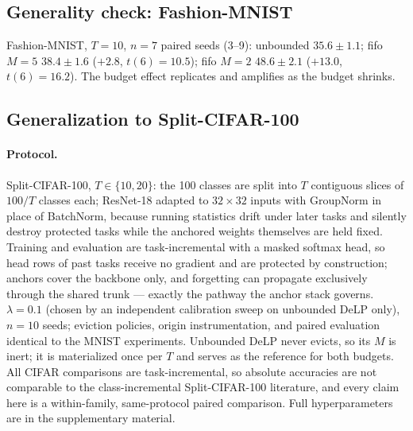 \documentclass[review,11pt,number]{elsarticle}
\newcommand{\delp}{DeLP}
\begin{document}
\subsection{Generality check: Fashion-MNIST}
\label{sec:exp-fashion}

Fashion-MNIST, $T{=}10$, $n{=}7$ paired seeds (3--9): unbounded
$35.6\pm1.1$; fifo $M{=}5$ $38.4\pm1.6$ ($+2.8$, $t(6){=}10.5$); fifo
$M{=}2$ $48.6\pm2.1$ ($+13.0$, $t(6){=}16.2$). The budget
effect replicates and amplifies as the budget shrinks.

\subsection{Generalization to Split-CIFAR-100}
\label{sec:exp-cifar}

\paragraph{Protocol.}
Split-CIFAR-100, $T \in \{10, 20\}$: the 100 classes are split into
$T$ contiguous slices of $100/T$ classes each; ResNet-18 adapted to
$32{\times}32$ inputs with GroupNorm in place of BatchNorm, because
running statistics drift under later tasks and silently destroy
protected tasks while the anchored weights themselves are held fixed.
Training and evaluation are task-incremental with a masked softmax
head, so head rows of past tasks receive no gradient and are protected
by construction; anchors cover the backbone only, and forgetting can
propagate exclusively through the shared trunk --- exactly the pathway
the anchor stack governs. $\lambda{=}0.1$ (chosen by an independent
calibration sweep on unbounded \delp{} only), $n{=}10$ seeds; eviction
policies, origin instrumentation, and paired evaluation identical to the
MNIST experiments. Unbounded \delp{} never evicts, so its $M$ is inert;
it is materialized once per $T$ and serves as the reference for both
budgets. All CIFAR comparisons are task-incremental, so absolute
accuracies are not comparable to the class-incremental Split-CIFAR-100
literature, and every claim here is a within-family, same-protocol
paired comparison. Full hyperparameters are in the supplementary
material.
\end{document}
